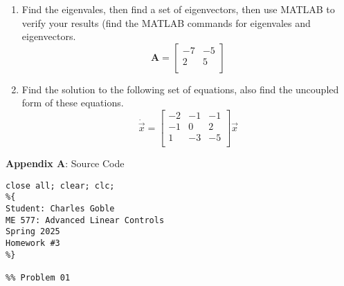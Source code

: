 \documentclass[titlepage]{article}
\begin{document}
\begin{enumerate}
	\item{Find the eigenvales, then find a set of eigenvectors, then use MATLAB to verify your results (find the MATLAB commands for eigenvales and eigenvectors}.
			\[\textbf{A} =
		\begin{bmatrix}
			-7 & -5\\
			2 & 5\\
		\end{bmatrix} \]
	
\newpage
	\item{Find the solution to the following set of equations, also find the uncoupled form of these equations}.
			\[\dot{\vec{x}} =
		\begin{bmatrix}
			-2 & -1 & -1\\
			-1 & 0 & 2\\
			1 & -3 & -5\\
		\end{bmatrix} \vec{x}\]
	
\end{enumerate}

\newpage
\textbf{Appendix A}: Source Code
\begin{lstlisting}[style=Matlab-editor]
close all; clear; clc;
%{
Student: Charles Goble
ME 577: Advanced Linear Controls
Spring 2025
Homework #3
%}

%% Problem 01

\end{lstlisting}
\end{document}
